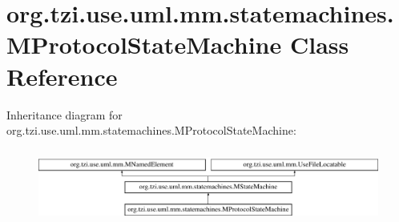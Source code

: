 \hypertarget{classorg_1_1tzi_1_1use_1_1uml_1_1mm_1_1statemachines_1_1_m_protocol_state_machine}{\section{org.\-tzi.\-use.\-uml.\-mm.\-statemachines.\-M\-Protocol\-State\-Machine Class Reference}
\label{classorg_1_1tzi_1_1use_1_1uml_1_1mm_1_1statemachines_1_1_m_protocol_state_machine}
}
Inheritance diagram for org.\-tzi.\-use.\-uml.\-mm.\-statemachines.\-M\-Protocol\-State\-Machine\-:\begin{figure}[H]
\begin{center}
\leavevmode
\includegraphics[height=2.427746cm]{classorg_1_1tzi_1_1use_1_1uml_1_1mm_1_1statemachines_1_1_m_protocol_state_machine}
\end{center}
\end{figure}

